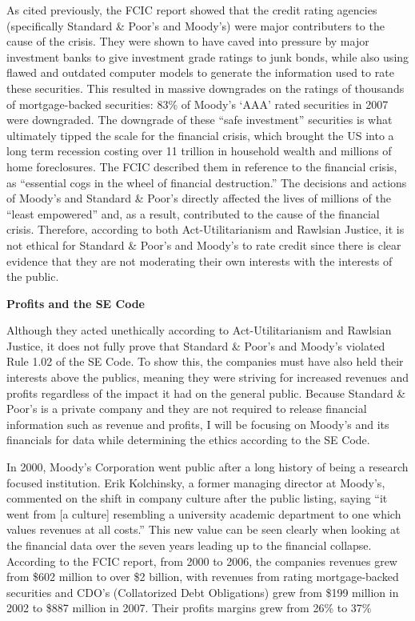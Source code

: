 \documentclass[11pt]{article}
\begin{document}
\begin{multicols}{2}
As cited previously, the FCIC report showed that the credit rating agencies (specifically Standard \& Poor's and Moody's) were major contributers to the cause of the crisis. \cite{govtReport, huffCreditCause}  They were shown to have caved into pressure by major investment banks to give investment grade ratings to junk bonds, while also using flawed and outdated computer models to generate the information used to rate these securities. \cite[p.~xxv]{govtReport}  This resulted in massive downgrades on the ratings of thousands of mortgage-backed securities: 83\% of Moody's `AAA' rated securities in 2007 were downgraded. \cite[p.~xxv]{govtReport} The downgrade of these ``safe investment'' securities is what ultimately tipped the scale for the financial crisis, which brought the US into a long term recession costing over 11 trillion in household wealth and millions of home foreclosures. The FCIC described them in reference to the financial crisis, as ``essential cogs in the wheel of financial destruction.'' The decisions and actions of Moody's and Standard \& Poor's directly affected the lives of millions of the ``least empowered'' and, as a result, contributed to the cause of the financial crisis. Therefore, according to both Act-Utilitarianism and Rawlsian Justice, it is not ethical for Standard \& Poor's and Moody's to rate credit since there is clear evidence that they are not moderating their own interests with the interests of the public.

\textbf{Profits and the SE Code}

Although they acted unethically according to Act-Utilitarianism and Rawlsian Justice, it does not fully prove that Standard \& Poor's and Moody's violated Rule 1.02 of the SE Code.  To show this, the companies must have also held their interests above the publics, meaning they were striving for increased revenues and profits regardless of the impact it had on the general public.  Because Standard \& Poor's is a private company and they are not required to release financial information such as revenue and profits, I will be focusing on Moody's and its financials for data while determining the ethics according to the SE Code.

In 2000, Moody's Corporation went public after a long history of being a research focused institution.  Erik Kolchinsky, a former managing director at Moody's, commented on the shift in company culture after the public listing, saying ``it went from [a culture] resembling a university academic department to one which values revenues at all costs.'' \cite[p.207]{govtReport}  This new value can be seen clearly when looking at the financial data over the seven years leading up to the financial collapse.  According to the FCIC report, from 2000 to 2006, the companies revenues grew from \$602 million to over \$2 billion, with revenues from rating mortgage-backed securities and CDO's (Collatorized Debt Obligations) grew from \$199 million in 2002 to \$887 million in 2007. Their profits margins grew from 26\% to 37\% \cite[p.149]{govtReport}


\end{multicols}
\end{document}
